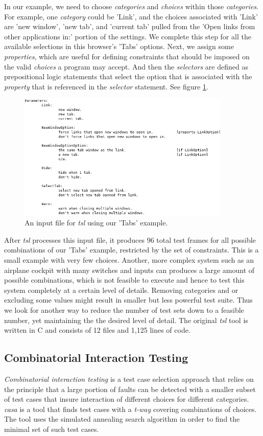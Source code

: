 \documentclass[a4full,12pt]{article}
\begin{document}
In our example, we need to choose \emph{categories} and \emph{choices} within those
  \emph{categories}. For example, one \emph{category} could be 'Link', and the choices
  associated with 'Link' are 'new window', 'new tab', and 'current tab' pulled from the
  'Open links from other applications in:' portion of the settings. We complete this step for all
  the available selections in this browser's 'Tabs' options. Next, we assign some 
  \emph{properties}, which are useful for defining constraints that should be imposed on
  the valid \emph{choices} a program may accept. And then the \emph{selectors} are defined
  as prepositional logic statements that select the option that is associated with the 
  \emph{property} that is referenced in the \emph{selector} statement. See figure \ref{fig:tsl_input_final}.
\begin{figure}[htb]
\centering
\includegraphics[width=4in,keepaspectratio]{images/tsl_input_final.png}
\caption{An input file for \emph{tsl} using our 'Tabs' example.}
\label{fig:tsl_input_final}
\end{figure}

After \emph{tsl} processes this input file, it produces 96 total test frames
  for all possible combinations of our 'Tabs' example, restricted by the set of constraints. This is a small example with very
  few choices. Another, more complex system such as an airplane cockpit with many switches
  and inputs can produces a large amount of possible combinations, which is not feasible to execute and hence to test this system completely at a certain level of details. Removing categories and or excluding some values might result in smaller but less powerful test suite. Thus we look for another way to reduce the number of test sets down to a feasible number, yet maintaining the the desired level of detail. The original \emph{tsl} tool is written in C and consists of 12 files and 1,125 lines of code.

\subsection{Combinatorial Interaction Testing}
\emph{Combinatorial interaction testing} is a test case selection approach that relies on the principle
  that a large portion of faults can be detected with a smaller subset of test cases that insure interaction
  of different choices for different categories.  \emph{casa} is a tool that finds test cases with a \emph{t-way} covering 
  combinations of choices. The tool uses the simulated annealing search algorithm in order to find
  the minimal set of such test cases.
  
\end{document}
